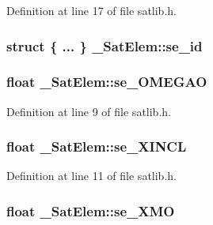Definition at line 17 of file satlib.\-h.

\hypertarget{struct___sat_elem_af713f30c8d04002d6b3f7ac53c19740e}{
\subsubsection[{se\-\_\-id}]{\setlength{\rightskip}{0pt plus 5cm}struct \{ ... \}   \-\_\-\-Sat\-Elem\-::se\-\_\-id}}\label{struct___sat_elem_af713f30c8d04002d6b3f7ac53c19740e}
\hypertarget{struct___sat_elem_af530e5942e833b59ba385cacbed189e0}{
\subsubsection[{se\-\_\-\-O\-M\-E\-G\-A\-O}]{\setlength{\rightskip}{0pt plus 5cm}float \-\_\-\-Sat\-Elem\-::se\-\_\-\-O\-M\-E\-G\-A\-O}}\label{struct___sat_elem_af530e5942e833b59ba385cacbed189e0}


Definition at line 9 of file satlib.\-h.

\hypertarget{struct___sat_elem_a5a9a336e24ea5df7051e5ce3b126a87e}{
\subsubsection[{se\-\_\-\-X\-I\-N\-C\-L}]{\setlength{\rightskip}{0pt plus 5cm}float \-\_\-\-Sat\-Elem\-::se\-\_\-\-X\-I\-N\-C\-L}}\label{struct___sat_elem_a5a9a336e24ea5df7051e5ce3b126a87e}


Definition at line 11 of file satlib.\-h.

\hypertarget{struct___sat_elem_aa146285d54323061c76de2405e64c6bf}{
\subsubsection[{se\-\_\-\-X\-M\-O}]{\setlength{\rightskip}{0pt plus 5cm}float \-\_\-\-Sat\-Elem\-::se\-\_\-\-X\-M\-O}}\label{struct___sat_elem_aa146285d54323061c76de2405e64c6bf}


